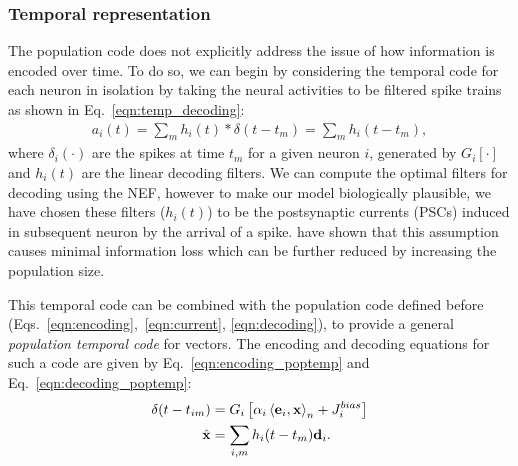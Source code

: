 \documentclass[10pt,letterpaper]{article}
\renewcommand{\vec}[1]{{\bf {#1}}}
\newcommand{\dotp}[3]{\left\langle {#1}, {#2} \right\rangle_{#3}}
\newcommand{\lif}[2]{G_{#1} \left[ {#2} \right]}
\begin{document}
\subsubsection{Temporal representation} %
The population code does not explicitly address the issue of how information is encoded over time. To do so, we can begin by considering the temporal code for each neuron in isolation by taking the neural activities to be filtered spike trains as shown in Eq.~\ref{eqn:temp_decoding}:
\begin{equation}
\label{eqn:temp_decoding}
\begin{aligned}
a_i(t) = \sum_m h_i(t) \ast \delta(t-t_m) = \sum_m h_i(t-t_m) ,
\end{aligned}
\end{equation}
where $\delta_i(\cdot)$ are the spikes at time $t_m$ for a given neuron $i$, generated by $\lif{i}{\cdot}$ and $h_i(t)$ are the linear decoding filters. We can compute the optimal filters for decoding using the NEF, however to make our model biologically plausible, we have chosen these filters ($h_i(t)$) to be the postsynaptic currents (PSCs) induced in subsequent neuron by the arrival of a spike.  have shown that this assumption causes minimal information loss which can be further reduced by increasing the population size. 

This temporal code can be combined with the population code defined before (Eqs.~\ref{eqn:encoding},~\ref{eqn:current}, \ref{eqn:decoding}), to provide a general \textit{population temporal code} for vectors. The encoding and decoding equations for such a code are given by Eq.~\ref{eqn:encoding_poptemp} and Eq.~\ref{eqn:decoding_poptemp}:
\begin{align}
\delta(t-t_{im}) &= \lif{i}{\alpha_i \dotp{\vec{e}_i}{\vec{x}}{n} + J_i^{bias}} \label{eqn:encoding_poptemp} \\
\hat{\vec{x}} &= \sum_{i,m} h_i(t-t_m) \vec{d}_i . \label{eqn:decoding_poptemp}
\end{align}
\end{document}
